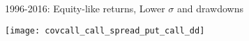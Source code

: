 \documentclass{beamer}
\begin{document}
\begin{frame}{1996-2016: Equity-like returns, Lower $\sigma$ and drawdowns}

\texttt{[image: covcall\_call\_spread\_put\_call\_dd]}

\end{frame}

%
%
%
%
%
%
%
%
%
%
%
%
%
%
%
\end{document}
